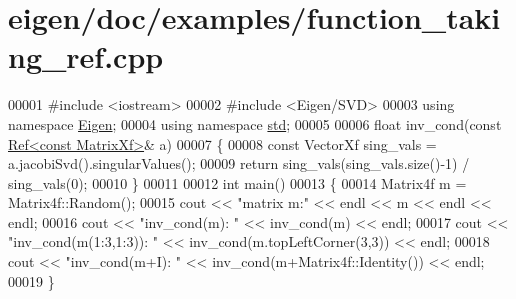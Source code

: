 \hypertarget{eigen_2doc_2examples_2function__taking__ref_8cpp_source}{}\section{eigen/doc/examples/function\+\_\+taking\+\_\+ref.cpp}
\label{eigen_2doc_2examples_2function__taking__ref_8cpp_source}

\begin{DoxyCode}
00001 \textcolor{preprocessor}{#include <iostream>}
00002 \textcolor{preprocessor}{#include <Eigen/SVD>}
00003 \textcolor{keyword}{using namespace }\hyperlink{namespace_eigen}{Eigen};
00004 \textcolor{keyword}{using namespace }\hyperlink{namespacestd}{std};
00005 
00006 \textcolor{keywordtype}{float} inv\_cond(\textcolor{keyword}{const} \hyperlink{group___core___module_class_eigen_1_1_ref}{Ref<const MatrixXf>}& a)
00007 \{
00008   \textcolor{keyword}{const} VectorXf sing\_vals = a.jacobiSvd().singularValues();
00009   \textcolor{keywordflow}{return} sing\_vals(sing\_vals.size()-1) / sing\_vals(0);
00010 \}
00011 
00012 \textcolor{keywordtype}{int} main()
00013 \{
00014   Matrix4f m = Matrix4f::Random();
00015   cout << \textcolor{stringliteral}{"matrix m:"} << endl << m << endl << endl;
00016   cout << \textcolor{stringliteral}{"inv\_cond(m):          "} << inv\_cond(m)                      << endl;
00017   cout << \textcolor{stringliteral}{"inv\_cond(m(1:3,1:3)): "} << inv\_cond(m.topLeftCorner(3,3))   << endl;
00018   cout << \textcolor{stringliteral}{"inv\_cond(m+I):        "} << inv\_cond(m+Matrix4f::Identity()) << endl;
00019 \}
\end{DoxyCode}
